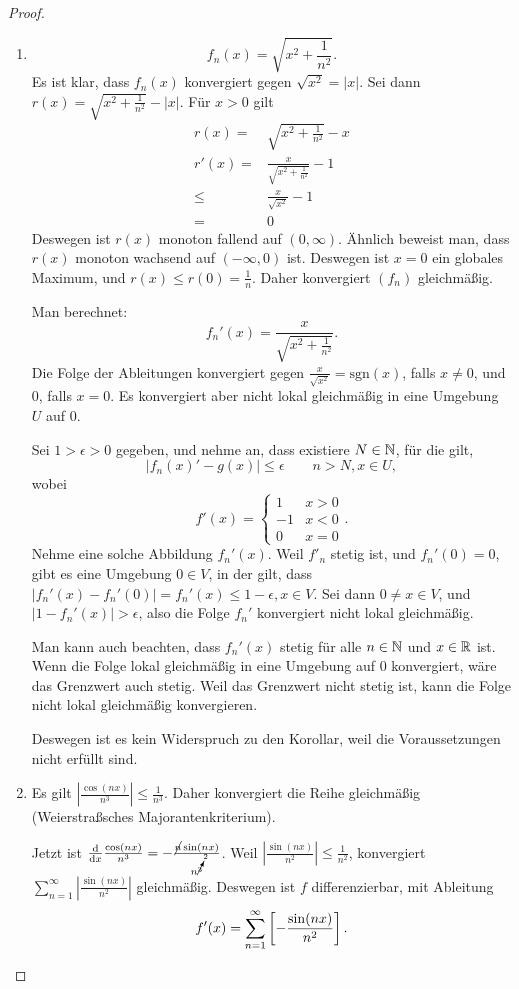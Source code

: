\begin{proof}
	\begin{enumerate}[label=\roman*)]
		\item \[
		f_n(x)=\sqrt{x^2+\frac{1}{n^2}} 
		.\] 
		Es ist klar, dass $f_n(x)$ konvergiert gegen $\sqrt{x^2} =|x|$. Sei dann $r(x)=\sqrt{x^2+\frac{1}{n^2}} -|x|$. F\"{u}r $x>0$ gilt
		\begin{align*}
			r(x)=& \sqrt{x^2+\frac{1}{n^2}}-x\\
			r'(x)=& \frac{x}{\sqrt{x^2+\frac{1}{n^2}} }-1\\
			\le& \frac{x}{\sqrt{x^2}}-1\\
			=&0
		\end{align*}
		Deswegen ist $r(x)$ monoton fallend auf $(0,\infty)$. Ähnlich beweist man, dass $r(x)$ monoton wachsend auf $(-\infty, 0)$ ist. Deswegen ist $x=0$ ein globales Maximum, und $r(x)\le r(0)=\frac{1}{n}$. Daher konvergiert $(f_n)$ gleichmäßig.

		Man berechnet:
		\[
			f_n'(x)=\frac{x}{\sqrt{x^2+\frac{1}{n^2}} }
		.\] 
		Die Folge der Ableitungen konvergiert gegen $\frac{x}{\sqrt{x^2} }=\text{sgn}(x)$, falls $x\neq 0$, und $0$, falls $x=0$. Es konvergiert aber nicht lokal gleichmäßig in eine Umgebung $U$ auf $0$.

		Sei $1>\epsilon>0$ gegeben, und nehme an, dass existiere $N\in \mathbb{N}$, f\"{u}r die gilt, 
		\[
		|f_n(x)'-g(x)|\le \epsilon\qquad n>N,x\in U
		,\] 
		wobei
		\[
		f'(x)=\begin{cases}
			1 & x > 0\\
			-1 & x < 0\\
			0 & x = 0
		\end{cases}
		.\] 
Nehme eine solche Abbildung $f_n'(x)$. Weil $f'_n$ stetig ist, und $f_n'(0)=0$, gibt es eine Umgebung $0\in V$, in der gilt, dass $|f_n'(x)-f_n'(0)|=f_n'(x)\le 1-\epsilon, x\in V$. Sei dann  $0\neq x\in V$, und $|1-f_n'(x)|>\epsilon$, also die Folge $f_n'$ konvergiert nicht lokal gleichmäßig.

Man kann auch beachten, dass $f_n'(x)$ stetig f\"{u}r alle $n\in \mathbb{N}$ und $x\in \mathbb{R}$ ist. Wenn die Folge lokal gleichmäßig in eine Umgebung auf $0$ konvergiert, wäre das Grenzwert auch stetig. Weil das Grenzwert nicht stetig ist, kann die Folge nicht lokal gleichmäßig konvergieren.

Deswegen ist es kein Widerspruch zu den Korollar, weil die Voraussetzungen nicht erfüllt sind.

\item Es gilt $\left|\frac{\cos(nx)}{n^3}\right|\le \frac{1}{n^3}$. Daher konvergiert die Reihe gleichmäßig (Weierstraßsches Majorantenkriterium).

	Jetzt ist $\dv{x} \frac{\cos(nx)}{n^3}=-\frac{\cancel{n}\sin(nx)}{n^{\cancelto{2}{3}}}$. Weil $\left|\frac{\sin(nx)}{n^2}\right|\le \frac{1}{n^2}$, konvergiert $\sum_{n=1}^{\infty} \left| \frac{\sin(nx)}{n^2} \right|$ gleichmäßig. Deswegen ist $f$ differenzierbar, mit Ableitung
	\[
		f'(x)=\sum_{n=1}^{\infty} \left[ -\frac{\sin(nx)}{n^2} \right] 
	.\qedhere\] 
\end{enumerate}
\end{proof}
